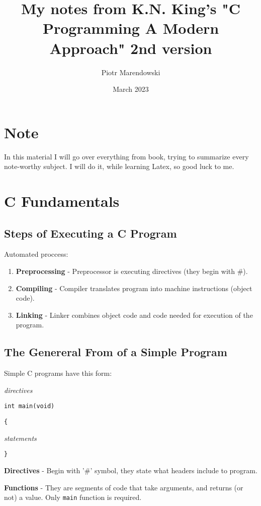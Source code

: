 \documentclass[12pt, openany]{book}
\title{My notes from K.N. King's "C Programming A Modern Approach" 2nd version}
\author{Piotr Marendowski}
\date{March 2023}
\newcommand\tab[1][1cm]{\hspace*{#1}}
\begin{document}
    \maketitle

    \chapter{Note}
    In this material I will go over everything from book,
    trying to summarize every note-worthy subject. I will do
    it, while learning Latex, so good luck to me.

    \tableofcontents

    \chapter{C Fundamentals}
    
    \section{Steps of Executing a C Program}
    Automated proccess:
    \begin{enumerate}
        \item\textbf{Preprocessing} - Preprocessor is executing directives
        (they begin with \#).
        \item\textbf{Compiling} - Compiler translates program into machine
        instructions (object code).
        \item\textbf{Linking} - Linker combines object code and code needed
        for execution of the program.
    \end{enumerate}

    \section{The Genereral From of a Simple Program}
    Simple C programs have this form: \smallskip

    \textit{directives} 

    \texttt{int main(void)}

    \texttt{\{}

    \tab\textit{statements}

    \texttt{\}}

    \textbf{Directives} - Begin with '\#' symbol, they state what headers
    include to program.

    \textbf{Functions} - They are segments of code that take arguments, and
    returns (or not) a value. Only \texttt{main} function is required.

       
\end{document}
